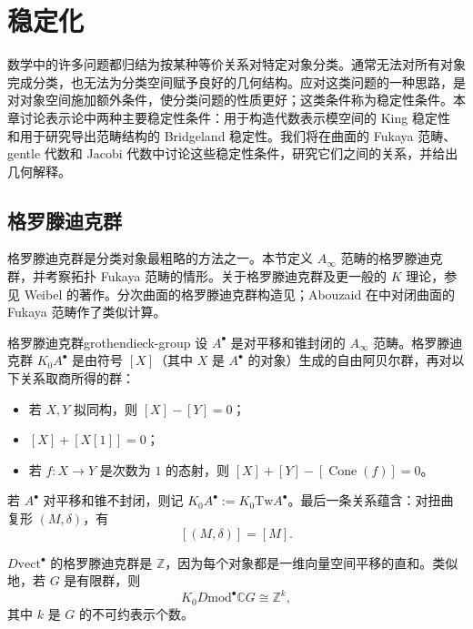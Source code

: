 \chapter{稳定化}\label{ch:stability}

数学中的许多问题都归结为按某种等价关系对特定对象分类。通常无法对所有对象完成分类，也无法为分类空间赋予良好的几何结构。应对这类问题的一种思路，是对对象空间施加额外条件，使分类问题的性质更好；这类条件称为稳定性条件。本章讨论表示论中两种主要稳定性条件：用于构造代数表示模空间的 King 稳定性 和用于研究导出范畴结构的 Bridgeland 稳定性。我们将在曲面的 Fukaya 范畴、gentle 代数和 Jacobi 代数中讨论这些稳定性条件，研究它们之间的关系，并给出几何解释。

\section{格罗滕迪克群}\label{sec:grothendieck-group}

格罗滕迪克群是分类对象最粗略的方法之一。本节定义 $A_\infty$ 范畴的格罗滕迪克群，并考察拓扑 Fukaya 范畴的情形。关于格罗滕迪克群及更一般的 $K$ 理论，参见 Weibel 的著作。分次曲面的格罗滕迪克群构造见；Abouzaid 在中对闭曲面的 Fukaya 范畴作了类似计算。

\begin{definition}{格罗滕迪克群}{grothendieck-group}
设 $A^{\bullet}$ 是对平移和锥封闭的 $A_\infty$ 范畴。格罗滕迪克群 $K_0A^{\bullet}$ 是由符号 $[X]$（其中 $X$ 是 $A^{\bullet}$ 的对象）生成的自由阿贝尔群，再对以下关系取商所得的群：
\begin{itemize}
  \item 若 $X,Y$ 拟同构，则 $[X]-[Y]=0$；
  \item $[X]+[X[1]]=0$；
  \item 若 $f\colon X\to Y$ 是次数为 $1$ 的态射，则 $[X]+[Y]-[\operatorname{Cone}(f)]=0$。
\end{itemize}
若 $A^{\bullet}$ 对平移和锥不封闭，则记 $K_0A^{\bullet}:=K_0\mathrm{Tw}A^{\bullet}$。最后一条关系蕴含：对扭曲复形 $(M,\delta)$，有
\[
  [(M,\delta)]=[M].
\]
\end{definition}

\begin{example}[向量空间与群表示]
$D\mathrm{vect}^{\bullet}$ 的格罗滕迪克群是 $\mathbb Z$，因为每个对象都是一维向量空间平移的直和。类似地，若 $G$ 是有限群，则
\[
  K_0D\mathrm{mod}^{\bullet}\mathbb CG\cong\mathbb Z^k,
\]
其中 $k$ 是 $G$ 的不可约表示个数。
\end{example}

